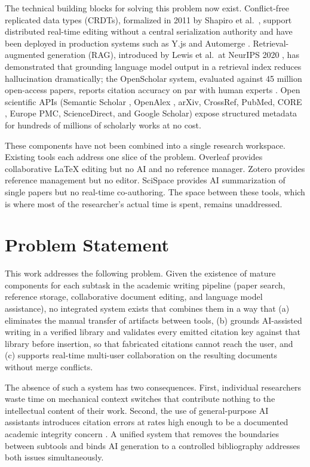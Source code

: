 The technical building blocks for solving this problem now exist. Conflict-free replicated data types (CRDTs), formalized in 2011 by Shapiro et al.\ \cite{shapiro2011crdt}, support distributed real-time editing without a central serialization authority and have been deployed in production systems such as Y.js \cite{yjs2024} and Automerge \cite{kleppmann2017jsoncrdt}. Retrieval-augmented generation (RAG), introduced by Lewis et al.\ at NeurIPS 2020 \cite{lewis2020rag}, has demonstrated that grounding language model output in a retrieval index reduces hallucination dramatically; the OpenScholar system, evaluated against 45 million open-access papers, reports citation accuracy on par with human experts \cite{asai2025openscholar}. Open scientific APIs (Semantic Scholar \cite{kinney2023semanticscholar}, OpenAlex \cite{priem2022openalex}, arXiv, CrossRef, PubMed, CORE \cite{knoth2023core}, Europe PMC, ScienceDirect, and Google Scholar) expose structured metadata for hundreds of millions of scholarly works at no cost.

These components have not been combined into a single research workspace. Existing tools each address one slice of the problem. Overleaf provides collaborative LaTeX editing but no AI and no reference manager. Zotero provides reference management but no editor. SciSpace \cite{scispace2024} provides AI summarization of single papers but no real-time co-authoring. The space between these tools, which is where most of the researcher's actual time is spent, remains unaddressed.

\section{Problem Statement}
\label{sec:problem}

This work addresses the following problem. Given the existence of mature components for each subtask in the academic writing pipeline (paper search, reference storage, collaborative document editing, and language model assistance), no integrated system exists that combines them in a way that (a) eliminates the manual transfer of artifacts between tools, (b) grounds AI-assisted writing in a verified library and validates every emitted citation key against that library before insertion, so that fabricated citations cannot reach the user, and (c) supports real-time multi-user collaboration on the resulting documents without merge conflicts.

The absence of such a system has two consequences. First, individual researchers waste time on mechanical context switches that contribute nothing to the intellectual content of their work. Second, the use of general-purpose AI assistants introduces citation errors at rates high enough to be a documented academic integrity concern \cite{walters2023fabrication, mugaanyi2024llmcitations}. A unified system that removes the boundaries between subtools and binds AI generation to a controlled bibliography addresses both issues simultaneously.


